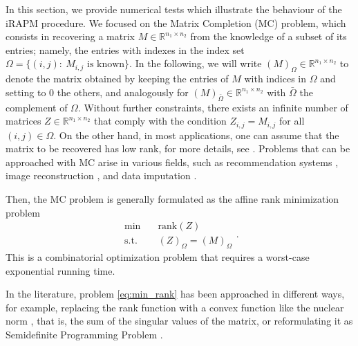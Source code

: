 \documentclass[pdflatex,sn-mathphys-num]{sn-jnl}
\numberwithin{equation}{section}%
\def\R{\mathbb{R}}
\theoremstyle{thmstyleone}%
\theoremstyle{thmstyletwo}%
\theoremstyle{thmstylethree}%
\begin{document}
In this section, we  provide numerical tests which illustrate the behaviour of the iRAPM procedure. We focused on the Matrix Completion (MC) problem, which consists in recovering a matrix $M\in\R^{n_1\times n_2}$ from the knowledge of a subset of its entries; namely, the entries with indexes in the index set $\Omega = \{(i,j): \ M_{i,j} \text{ is known}\}$. In the following, we will write $(M)_\Omega\in\R^{n_1\times n_2}$ to denote the matrix obtained by keeping the entries of $M$ with indices in $\Omega$ and setting to 0 the others, and analogously for $(M)_{\bar \Omega}\in\R^{n_1\times n_2}$ with $\bar \Omega$ the complement of $\Omega$. Without further constraints, there exists an infinite number of matrices $Z\in\mathbb{R}^{n_1\times n_2}$ that comply with the condition $Z_{i,j} = M_{i,j}$ for all $(i,j)\in\Omega$. On the other hand, in most applications, one can assume that the matrix to be recovered has low rank, for more details, see \cite{candes2012exact}. Problems that can be approached with MC arise in various fields, such as recommendation systems \cite{ramlatchan2018survey}, image reconstruction \cite{nguyen2019low}, and data imputation \cite{agarwal2018model, Silei_energies}.

Then, the MC problem is generally formulated as the affine rank minimization problem
\begin{equation}
	\label{eq:min_rank}
	\begin{aligned}
		\min \quad & \textrm{rank}(Z) \\    
		\textrm{s.t.} \quad & (Z)_\Omega = (M)_\Omega
	\end{aligned} .
\end{equation}
This is a combinatorial optimization problem that requires a worst-case exponential running time.

In the literature, problem \eqref{eq:min_rank} has been approached in different ways, for example, replacing the rank function with a convex function like the nuclear norm \cite{candes2012exact}, that is, the sum of the singular values of the matrix, or reformulating it as Semidefinite Programming Problem \cite{Bellavia21}. 
\end{document}

